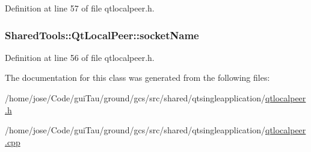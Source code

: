 Definition at line 57 of file qtlocalpeer.\-h.

\hypertarget{class_shared_tools_1_1_qt_local_peer_a77fcd62eafade486e1d9b03bdaaf1fd8}{
\subsubsection[{socket\-Name}]{ Shared\-Tools\-::\-Qt\-Local\-Peer\-::socket\-Name\hspace{0.3cm}{\ttfamily [protected]}}}\label{class_shared_tools_1_1_qt_local_peer_a77fcd62eafade486e1d9b03bdaaf1fd8}


Definition at line 56 of file qtlocalpeer.\-h.



The documentation for this class was generated from the following files\-:\begin{DoxyCompactItemize}
\item 
/home/jose/\-Code/gui\-Tau/ground/gcs/src/shared/qtsingleapplication/\hyperlink{qtlocalpeer_8h}{qtlocalpeer.\-h}\item 
/home/jose/\-Code/gui\-Tau/ground/gcs/src/shared/qtsingleapplication/\hyperlink{qtlocalpeer_8cpp}{qtlocalpeer.\-cpp}\end{DoxyCompactItemize}
